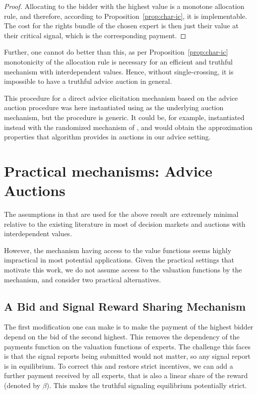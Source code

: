 \begin{proof}
Allocating to the bidder with the highest value is a monotone allocation rule, and therefore, according to Proposition~\ref{prop:char-ic}, it is implementable. The cost for the rights bundle of the chosen expert is then just their value at their critical signal, which is the corresponding payment.
\end{proof}

Further, one cannot do better than this, as per Proposition~\ref{prop:char-ic} monotonicity of the allocation rule is necessary for an efficient and truthful mechanism with interdependent values. Hence, without single-crossing, it is impossible to have a truthful advice auction in general.

This procedure for a direct advice elicitation mechanism based on the advice auction procedure was here instantiated using \cite{maskin1992auctions}  as the underlying auction mechanism, but the procedure is generic. It could be, for example, instantiated instead with the randomized mechanism of \cite{eden2018interdependent}, and would obtain the approximation properties that algorithm provides in auctions in our advice setting.


\section{Practical mechanisms: Advice Auctions}

The assumptions in \cite{roughgarden2016optimal} that are used for the above result are extremely minimal relative to the existing literature in most of decision markets and auctions with interdependent values.

However, the mechanism having access to the value functions seems highly impractical in most potential applications.
Given the practical settings that motivate this work, 
we do not assume access to the valuation functions by the mechanism, and consider two practical alternatives.


\subsection{A Bid and Signal Reward Sharing Mechanism}

The first modification one can make is to make the payment of the highest bidder depend on the bid of the second highest. This removes the dependency of the payments function on the valuation functions of experts.
The challenge this faces is that the signal reports being submitted would not matter, so any signal report is in equilibrium. To correct this and restore strict incentives, we can add a further payment received by all experts, that is also a linear share of the reward (denoted by $\beta$). This makes the truthful signaling equilibrium potentially strict.


